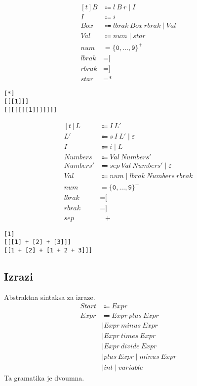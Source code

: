 \documentclass{report}
\newcommand{\Null}{\varepsilon}
\newcommand{\Char}[1]{\texttt{#1}}
\newcommand{\Spc}{\ }
\newcommand{\Union}{\mathrel{|}}
\newcommand{\KleenePlus}[1]{#1^+}
\newcommand{\Arrow}{\Coloneq}
\newcommand{\NT}[1]{{#1}}
\newcommand{\T}[1]{{#1}}
\begin{document}
\begin{equation*}
  \begin{aligned}[t]
    \NT{B} &\Arrow \T{l} \Spc \NT{B} \Spc \T{r} \Union \NT{I}\\
    \NT{I} &\Arrow \T{i}\\[1em]
    \NT{Box} &\Arrow \T{lbrak} \Spc \NT{Box} \Spc \T{rbrak} \Union \NT{Val}\\
    \NT{Val} &\Arrow \T{num} \Union \T{star}\\[1em]
    \T{num} &= \KleenePlus{\{\Char{0}, \dots, \Char{9}\}}\\
    \T{lbrak} &= \Char{[}\\
    \T{rbrak} &= \Char{]}\\
    \T{star} &= \Char{*}
  \end{aligned}
\end{equation*}
\begin{lstlisting}
[*]
[[[1]]]
[[[[[[[1]]]]]]]
\end{lstlisting}

\begin{equation*}
  \begin{aligned}[t]
    \NT{L} &\Arrow \NT{I} \Spc \NT{L'}\\
    \NT{L'} &\Arrow \T{s} \Spc \NT{I} \Spc \NT{L'} \Union \Null\\
    \NT{I} &\Arrow \T{i} \Union \NT{L}\\[1em]
    \NT{Numbers} &\Arrow \T{Val} \Spc \NT{Numbers'}\\
    \NT{Numbers'} &\Arrow \T{sep} \Spc \T{Val} \Spc \NT{Numbers'} \Union \Null\\
    \NT{Val} &\Arrow \T{num} \Union \T{lbrak} \Spc \NT{Numbers} \Spc \T{rbrak}\\[1em]
    \T{num} &= \KleenePlus{\{\Char{0}, \dots, \Char{9}\}}\\
    \T{lbrak} &= \Char{[}\\
    \T{rbrak} &= \Char{]}\\
    \T{sep} &= \Char{+}
  \end{aligned}
\end{equation*}
\begin{lstlisting}
[1]
[[[1] + [2] + [3]]]
[[1 + [2] + [1 + 2 + 3]]]
\end{lstlisting}

\subsection*{Izrazi}

Abstraktna sintaksa za izraze.
\begin{align*}
  \NT{Start} &\Arrow \NT{Expr}\\
  \NT{Expr} &\Arrow \NT{Expr} \Spc \T{plus} \Spc \NT{Expr}\\
  &\Union \NT{Expr} \Spc \T{minus} \Spc \NT{Expr}\\
  &\Union \NT{Expr} \Spc \T{times} \Spc \NT{Expr}\\
  &\Union \NT{Expr} \Spc \T{divide} \Spc \NT{Expr}\\
  &\Union \T{plus} \Spc \NT{Expr} \Union \T{minus} \Spc \NT{Expr}\\
  &\Union \T{int} \Union \T{variable}
\end{align*}
Ta gramatika je dvoumna.
\end{document}
